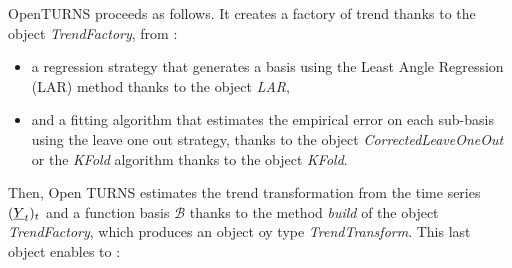 OpenTURNS proceeds as follows. It creates a factory of trend  thanks to the  object \emph{TrendFactory},  from :
\begin{itemize}
  \item a regression strategy that generates a basis using the Least Angle Regression (LAR) method thanks to the object \emph{LAR},
  \item and a fitting algorithm that estimates the empirical error on each sub-basis using the leave one out strategy, thanks to the object \emph{CorrectedLeaveOneOut} or the \emph{KFold} algorithm thanks to the object \emph{KFold}.
\end{itemize}
Then, Open TURNS estimates the trend transformation from the time series $({\underline{Y}}_t)_t$ and a function basis $\mathcal{B}$ thanks to the method \emph{build} of the object \emph{TrendFactory}, which produces an object oy type \emph{TrendTransform}. This last object enables to :

